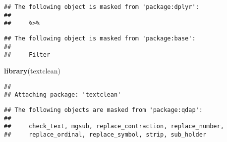 \documentclass[]{article}
\newenvironment{Shaded}{\begin{snugshade}}{\end{snugshade}}
\newcommand{\KeywordTok}[1]{\textcolor[rgb]{0.13,0.29,0.53}{\textbf{#1}}}
\newcommand{\StringTok}[1]{\textcolor[rgb]{0.31,0.60,0.02}{#1}}
\newcommand{\OperatorTok}[1]{\textcolor[rgb]{0.81,0.36,0.00}{\textbf{#1}}}
\newcommand{\NormalTok}[1]{#1}
\begin{document}
\begin{verbatim}
## The following object is masked from 'package:dplyr':
## 
##     %>%
\end{verbatim}

\begin{verbatim}
## The following object is masked from 'package:base':
## 
##     Filter
\end{verbatim}

\begin{Shaded}
\begin{Highlighting}[]
\KeywordTok{library}\NormalTok{(textclean)}
\end{Highlighting}
\end{Shaded}

\begin{verbatim}
## 
## Attaching package: 'textclean'
\end{verbatim}

\begin{verbatim}
## The following objects are masked from 'package:qdap':
## 
##     check_text, mgsub, replace_contraction, replace_number,
##     replace_ordinal, replace_symbol, strip, sub_holder
\end{verbatim}

\begin{Shaded}
\end{Shaded}
\end{document}
